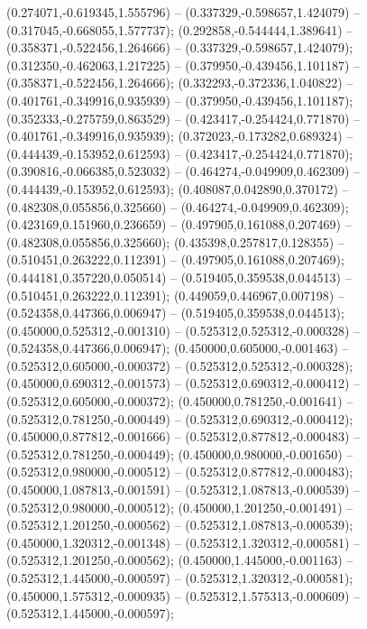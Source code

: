  (0.274071,-0.619345,1.555796) -- (0.337329,-0.598657,1.424079) -- (0.317045,-0.668055,1.577737);
 (0.292858,-0.544444,1.389641) -- (0.358371,-0.522456,1.264666) -- (0.337329,-0.598657,1.424079);
 (0.312350,-0.462063,1.217225) -- (0.379950,-0.439456,1.101187) -- (0.358371,-0.522456,1.264666);
 (0.332293,-0.372336,1.040822) -- (0.401761,-0.349916,0.935939) -- (0.379950,-0.439456,1.101187);
 (0.352333,-0.275759,0.863529) -- (0.423417,-0.254424,0.771870) -- (0.401761,-0.349916,0.935939);
 (0.372023,-0.173282,0.689324) -- (0.444439,-0.153952,0.612593) -- (0.423417,-0.254424,0.771870);
 (0.390816,-0.066385,0.523032) -- (0.464274,-0.049909,0.462309) -- (0.444439,-0.153952,0.612593);
 (0.408087,0.042890,0.370172) -- (0.482308,0.055856,0.325660) -- (0.464274,-0.049909,0.462309);
 (0.423169,0.151960,0.236659) -- (0.497905,0.161088,0.207469) -- (0.482308,0.055856,0.325660);
 (0.435398,0.257817,0.128355) -- (0.510451,0.263222,0.112391) -- (0.497905,0.161088,0.207469);
 (0.444181,0.357220,0.050514) -- (0.519405,0.359538,0.044513) -- (0.510451,0.263222,0.112391);
 (0.449059,0.446967,0.007198) -- (0.524358,0.447366,0.006947) -- (0.519405,0.359538,0.044513);
 (0.450000,0.525312,-0.001310) -- (0.525312,0.525312,-0.000328) -- (0.524358,0.447366,0.006947);
 (0.450000,0.605000,-0.001463) -- (0.525312,0.605000,-0.000372) -- (0.525312,0.525312,-0.000328);
 (0.450000,0.690312,-0.001573) -- (0.525312,0.690312,-0.000412) -- (0.525312,0.605000,-0.000372);
 (0.450000,0.781250,-0.001641) -- (0.525312,0.781250,-0.000449) -- (0.525312,0.690312,-0.000412);
 (0.450000,0.877812,-0.001666) -- (0.525312,0.877812,-0.000483) -- (0.525312,0.781250,-0.000449);
 (0.450000,0.980000,-0.001650) -- (0.525312,0.980000,-0.000512) -- (0.525312,0.877812,-0.000483);
 (0.450000,1.087813,-0.001591) -- (0.525312,1.087813,-0.000539) -- (0.525312,0.980000,-0.000512);
 (0.450000,1.201250,-0.001491) -- (0.525312,1.201250,-0.000562) -- (0.525312,1.087813,-0.000539);
 (0.450000,1.320312,-0.001348) -- (0.525312,1.320312,-0.000581) -- (0.525312,1.201250,-0.000562);
 (0.450000,1.445000,-0.001163) -- (0.525312,1.445000,-0.000597) -- (0.525312,1.320312,-0.000581);
 (0.450000,1.575312,-0.000935) -- (0.525312,1.575313,-0.000609) -- (0.525312,1.445000,-0.000597);
